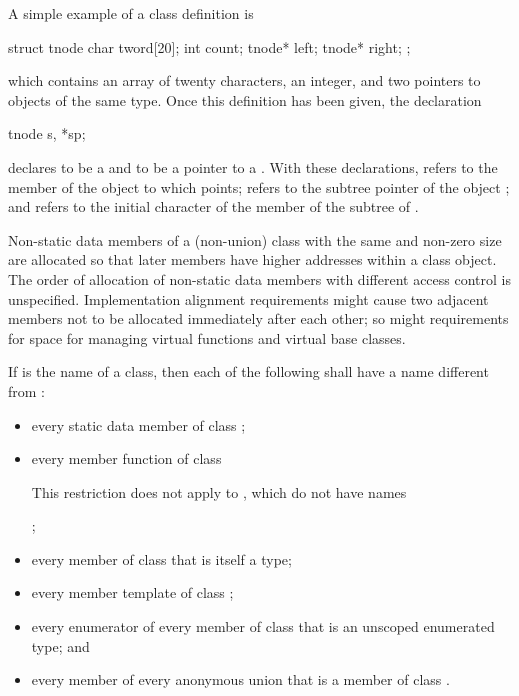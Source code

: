 \pnum
\begin{example}
A simple example of a class definition is
\begin{codeblock}
struct tnode {
  char tword[20];
  int count;
  tnode* left;
  tnode* right;
};
\end{codeblock}
which contains an array of twenty characters, an integer, and two
pointers to objects of the same type. Once this definition has been
given, the declaration
\begin{codeblock}
tnode s, *sp;
\end{codeblock}
declares  to be a  and  to be a pointer
to a . With these declarations,  refers to
the  member of the object to which  points;
 refers to the  subtree pointer of the object
; and  refers to the initial character
of the  member of the  subtree of .
\end{example}

\pnum
\begin{note}
%
Non-static data members of a (non-union) class
with the same  and
non-zero size
are allocated so that later
members have higher addresses within a class object.
%
The order of allocation of non-static data members
with different access control
is unspecified.
Implementation alignment requirements might cause two adjacent members
not to be allocated immediately after each other; so might requirements
for space for managing virtual functions and
virtual base classes.
\end{note}

\pnum
If  is the name of a class, then each of the following shall
have a name different from :
\begin{itemize}
\item every static data member of class ;

\item every member function of class 
\begin{note}
This restriction does not apply to ,
which do not have names
\end{note}%
;

\item every member of class  that is itself a type;

\item every member template of class ;

\item every enumerator of every member of class  that is an
unscoped enumerated type; and

\item every member of every anonymous union that is a member of class
.
\end{itemize}

